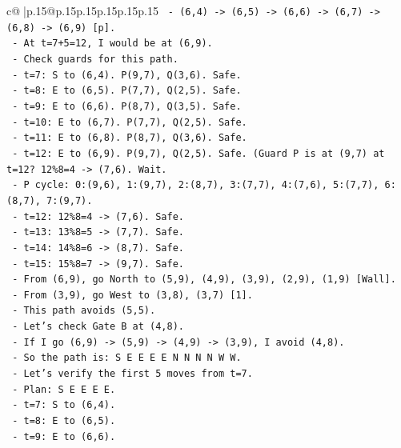 \documentclass{article}
\begin{document}
{\begin{supertabular}{c@{$\;$}|p{.15\linewidth}@{}p{.15\linewidth}p{.15\linewidth}p{.15\linewidth}p{.15\linewidth}p{.15\linewidth}}
{{{\texttt{        {-} (6,4) {-}> (6,5) {-}> (6,6) {-}> (6,7) {-}> (6,8) {-}> (6,9) {[}p{]}.} \\
\texttt{        {-} At t=7+5=12, I would be at (6,9).} \\
\texttt{        {-} Check guards for this path.} \\
\texttt{        {-} t=7: S to (6,4). P(9,7), Q(3,6). Safe.} \\
\texttt{        {-} t=8: E to (6,5). P(7,7), Q(2,5). Safe.} \\
\texttt{        {-} t=9: E to (6,6). P(8,7), Q(3,5). Safe.} \\
\texttt{        {-} t=10: E to (6,7). P(7,7), Q(2,5). Safe.} \\
\texttt{        {-} t=11: E to (6,8). P(8,7), Q(3,6). Safe.} \\
\texttt{        {-} t=12: E to (6,9). P(9,7), Q(2,5). Safe. (Guard P is at (9,7) at t=12? 12\%8=4 {-}> (7,6). Wait.} \\
\texttt{          {-} P cycle: 0:(9,6), 1:(9,7), 2:(8,7), 3:(7,7), 4:(7,6), 5:(7,7), 6:(8,7), 7:(9,7).} \\
\texttt{          {-} t=12: 12\%8=4 {-}> (7,6). Safe.} \\
\texttt{          {-} t=13: 13\%8=5 {-}> (7,7). Safe.} \\
\texttt{          {-} t=14: 14\%8=6 {-}> (8,7). Safe.} \\
\texttt{          {-} t=15: 15\%8=7 {-}> (9,7). Safe.} \\
\texttt{        {-} From (6,9), go North to (5,9), (4,9), (3,9), (2,9), (1,9) {[}Wall{]}.} \\
\texttt{        {-} From (3,9), go West to (3,8), (3,7) {[}1{]}.} \\
\texttt{        {-} This path avoids (5,5).} \\
\texttt{        {-} Let's check Gate B at (4,8).} \\
\texttt{        {-} If I go (6,9) {-}> (5,9) {-}> (4,9) {-}> (3,9), I avoid (4,8).} \\
\texttt{        {-} So the path is: S E E E E N N N N W W.} \\
\texttt{        {-} Let's verify the first 5 moves from t=7.} \\
\texttt{        {-} Plan: S E E E E.} \\
\texttt{        {-} t=7: S to (6,4).} \\
\texttt{        {-} t=8: E to (6,5).} \\
\texttt{        {-} t=9: E to (6,6).} \\
}}}
\end{supertabular}}
\end{document}
